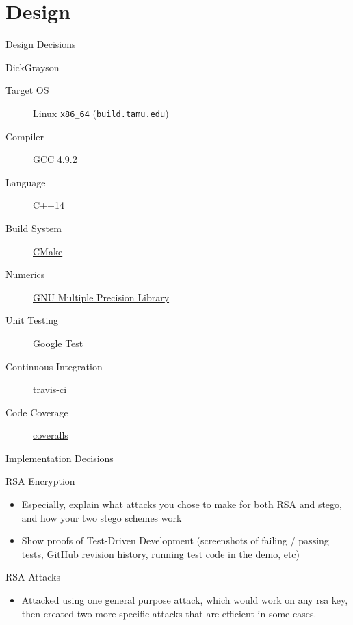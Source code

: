 \documentclass[presentation]{beamer}
\begin{document}
\section{Design}
\label{sec:orgheadline1}
\begin{frame}[fragile,label=sec-2-1]{Design Decisions}
 \begin{block}{DickGrayson}
\begin{description}
\item[{Target OS}] Linux \texttt{x86\_64} (\texttt{build.tamu.edu})
\item[{Compiler}] \href{https://gcc.gnu.org/}{GCC 4.9.2}
\item[{Language}] C++14
\item[{Build System}] \href{https://cmake.org}{CMake}
\item[{Numerics}] \href{https://gmplib.org}{GNU Multiple Precision Library}
\item[{Unit Testing}] \href{https://code.google.com/p/googletest/}{Google Test}
\item[{Continuous Integration}] \href{http://travis-ci.org}{travis-ci}
\item[{Code Coverage}] \href{http://coveralls.io}{coveralls}
\end{description}
\end{block}
\end{frame}
\begin{frame}[label=sec-2-2]{Implementation Decisions}
\begin{block}{RSA Encryption}
\begin{itemize}
\item Especially, explain what attacks you chose to make for both RSA and stego, and
how your two stego schemes work
\item Show proofs of Test-Driven Development (screenshots of failing / passing
tests, GitHub revision history, running test code in the demo, etc)
\end{itemize}
\end{block}
\begin{block}{RSA Attacks}
\begin{itemize}
\item Attacked using one general purpose attack, which would work on any rsa key, 
then created two more specific attacks that are efficient in some cases.
\end{itemize}
\end{block}
\end{frame}
\end{document}
